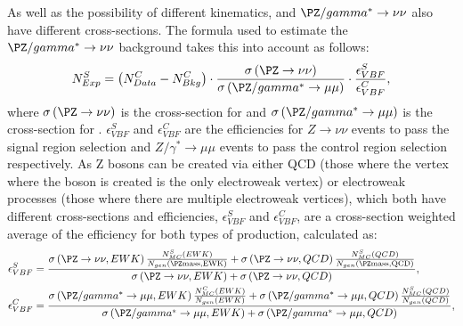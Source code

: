 As well as the possibility of different kinematics, \Zmumu and $\PZ/\gamma^{*}\rightarrow\nu\nu$ also have different cross-sections. The formula used to estimate the $\PZ/\gamma^{*}\rightarrow\nu\nu$ background takes this into account as follows:
\begin{equation}
  \label{eq:zdatabkg}
  N^{S}_{Exp}=\left(N^{C}_{Data}-N^{C}_{Bkg}\right)\cdot\frac{\sigma\left(\PZ\rightarrow\nu\nu\right)}{\sigma\left(\PZ/\gamma^{*}\rightarrow\mu\mu\right)}\cdot\frac{\epsilon^{S}_{VBF}}{\epsilon^{C}_{VBF}},
\end{equation}
where $\sigma\left(\PZ\rightarrow\nu\nu\right)$ is the cross-section for \Znunu and $\sigma\left(\PZ/\gamma^{*}\rightarrow\mu\mu\right)$ is the cross-section for \Zmumu. $\epsilon^{S}_{VBF}$ and $\epsilon^{C}_{VBF}$ are the efficiencies for $Z\rightarrow\nu\nu$ events to pass the signal region selection and $Z/\gamma^{*}\rightarrow\mu\mu$ events to pass the control region selection respectively. As Z bosons can be created via either \ac{QCD} (those where the vertex where the \PZ boson is created is the only electroweak vertex) or electroweak processes (those where there are multiple electroweak vertices), which both have different cross-sections and efficiencies, $\epsilon^{S}_{VBF}$ and $\epsilon^{C}_{VBF}$, are a cross-section weighted average of the efficiency for both types of production, calculated as:
\begin{align}
  \label{eq:zdataeffs}
  \epsilon^{S}_{VBF}&=\frac{ \sigma\left(\PZ\rightarrow\nu\nu,EWK\right) \frac{N^{S}_{MC}\left(EWK\right)} {N_{gen}\left(\PZ \rm{mass},EWK\right)} + \sigma\left(\PZ\rightarrow\nu\nu,QCD\right) \frac{N^{S}_{MC}\left(QCD\right)} {N_{gen}\left(\PZ \rm{mass},QCD\right)} } {\sigma\left(\PZ\rightarrow\nu\nu,EWK\right) + \sigma\left(\PZ\rightarrow\nu\nu,QCD\right)},\\
  \label{eq:zdataeffc}
  \epsilon^{C}_{VBF}&=\frac{  \sigma\left(\PZ/\gamma^{*}\rightarrow\mu\mu,EWK\right) \frac{N^{C}_{MC}\left(EWK\right)} {N_{gen}\left(EWK\right)} + \sigma\left(\PZ/\gamma^{*}\rightarrow\mu\mu,QCD\right) \frac{N^{S}_{MC}\left(QCD\right)} {N_{gen}\left(QCD\right)}  }{\sigma\left(\PZ/\gamma^{*}\rightarrow\mu\mu,EWK\right)+\sigma\left(\PZ/\gamma^{*}\rightarrow\mu\mu,QCD\right)},
\end{align}
